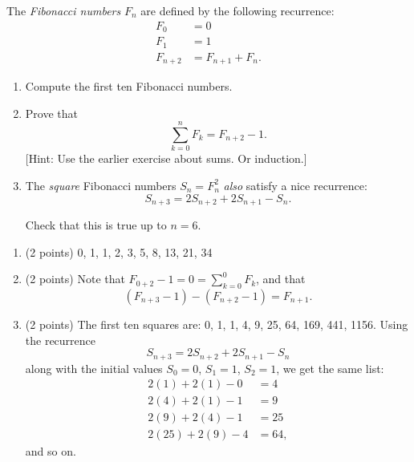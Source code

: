 \documentclass[12pt]{rudin}
\begin{document}
\begin{Exercise}
    The \emph{Fibonacci numbers} $F_n$ are defined by the following recurrence:
    \begin{align*}
        F_0 &= 0 \\
        F_1 &= 1 \\
        F_{n + 2} &= F_{n + 1} + F_n.
    \end{align*}

    \begin{enumerate}[label=(\textbf{\alph*})]
        \item Compute the first ten Fibonacci numbers.

        \item Prove that
            \begin{equation*}
                \sum_{k = 0}^n F_k = F_{n + 2} - 1.
            \end{equation*}
            [Hint: Use the earlier exercise about sums. Or induction.]

        \item The \emph{square} Fibonacci numbers $S_n = F_n^2$ \emph{also}
            satisfy a nice recurrence:
            \begin{equation*}
                S_{n + 3} = 2 S_{n + 2} + 2 S_{n + 1} - S_n.
            \end{equation*}

            Check that this is true up to $n = 6$.
    \end{enumerate}
\end{Exercise}

\begin{Answer}
    \begin{enumerate}[label=(\textbf{\alph*})]
	    \item (2 points) 0, 1, 1, 2, 3, 5, 8, 13, 21, 34

	    \item (2 points) Note that $F_{0 + 2} - 1 = 0 = \sum_{k = 0}^0 F_k$, and that
            \begin{equation*}
		    (F_{n + 3} - 1) - (F_{n + 2} - 1) = F_{n + 1}.
            \end{equation*}

    \item (2 points) The first ten squares are: 0, 1, 1, 4, 9, 25, 64, 169, 441, 1156.
		Using the recurrence
            \begin{equation*}
                S_{n + 3} = 2 S_{n + 2} + 2 S_{n + 1} - S_n
            \end{equation*}
	    along with the initial values $S_0 = 0$, $S_1 = 1$, $S_2 = 1$, we
	    get the same list:
	    \begin{align*}
		    2 (1) + 2 (1) - 0 &= 4 \\
		    2 (4) + 2 (1) - 1 &= 9 \\
		    2 (9) + 2 (4) - 1 &= 25 \\
		    2 (25) + 2(9) - 4 &= 64,
	    \end{align*}
	    and so on.
    \end{enumerate}
\end{Answer}
\end{document}
